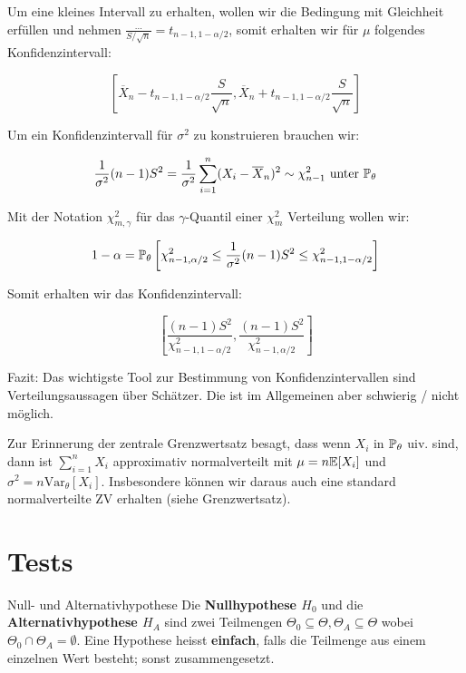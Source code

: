 Um eine kleines Intervall zu erhalten, wollen wir die Bedingung mit Gleichheit erfüllen und nehmen $\frac{...}{ S / \sqrt{n}} = t_{n-1, 1 - \alpha / 2}$, somit erhalten wir für $\mu$ folgendes Konfidenzintervall:

$$\left[ \overline{X}_n - t_{n-1, 1 - \alpha / 2} \frac{S}{\sqrt{n}},  \overline{X}_n + t_{n-1, 1 - \alpha / 2} \frac{S}{\sqrt{n}} \right]$$

Um ein Konfidenzintervall für $\sigma^2$ zu konstruieren brauchen wir:

$$\frac{1}{\sigma^2} (n-1) S^2 = \frac{1}{\sigma^2} \sum\limits_{i=1}^n (X_i - \overline{X}_n)^2 \sim \chi_{n-1}^2 \text{ unter } \mathbb{P}_\theta$$

Mit der Notation $\chi_{m, \gamma}^2$ für das $\gamma$-Quantil einer $\chi_m^2$ Verteilung wollen wir:

$$1 - \alpha = \mathbb{P}_\theta \left[ \chi_{n-1, \alpha/2}^2 \leq \frac{1}{\sigma^2} (n-1) S^2 \leq \chi_{n-1, 1- \alpha/2}^2\right]$$

Somit erhalten wir das Konfidenzintervall:

$$\left[ \frac{(n-1) S^2}{\chi_{n-1, 1-\alpha/2}^2} , \frac{(n-1) S^2}{\chi_{n-1, \alpha/2}^2} \right]$$

Fazit: Das wichtigste Tool zur Bestimmung von Konfidenzintervallen sind Verteilungsaussagen über Schätzer. Die ist im Allgemeinen aber schwierig / nicht möglich.



Zur Erinnerung der zentrale Grenzwertsatz besagt, dass wenn $X_i$ in $\mathbb{P}_\theta$ uiv. sind, dann ist $\sum_{i=1}^n X_i$ approximativ normalverteilt mit $\mu = n \mathbb{E}[X_i]$ und $\sigma^2 = n \text{Var}_\theta[X_i]$. Insbesondere können wir daraus auch eine standard normalverteilte ZV erhalten (siehe Grenzwertsatz).


\section*{Tests}



\begin{mainbox}{Null- und Alternativhypothese}
    Die \textbf{Nullhypothese $H_0$} und die \textbf{Alternativhypothese $H_A$} sind zwei Teilmengen $\Theta_0 \subseteq \Theta, \Theta_A \subseteq \Theta$ wobei $\Theta_0 \cap \Theta_A = \emptyset$. Eine Hypothese heisst \textbf{einfach}, falls die Teilmenge aus einem einzelnen Wert besteht; sonst zusammengesetzt.
\end{mainbox}


